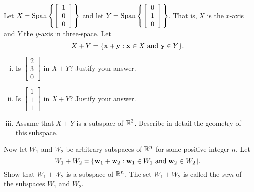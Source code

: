 \begin{example} ~

\ba
\item Let $X = \text{Span}\left\{ \left[ \begin{array}{c} 1\\0\\0 \end{array} \right] \right\}$ and let $Y = \text{Span}\left\{ \left[ \begin{array}{c} 0\\1\\0 \end{array} \right] \right\}$. That is, $X$ is the $x$-axis and $Y$ the $y$-axis in three-space. Let
\[X+Y = \{\mathbf{x}+\mathbf{y} : \mathbf{x} \in X \text{ and } \mathbf{y} \in Y\}.\]
	\begin{enumerate}[i.]
	\item Is $\left[ \begin{array}{c} 2\\3\\0 \end{array} \right]$ in $X+Y$? Justify your answer. 
	
	\item Is $\left[ \begin{array}{c} 1\\1\\1 \end{array} \right]$ in $X+Y$? Justify your  answer. 
	
	\item Assume that $X+Y$ is a subspace of $\mathbb{R}^3$. Describe in detail the geometry of this subspace.  
	
	\end{enumerate}

\item Now let $W_1$ and $W_2$ be arbitrary subspaces of $\mathbb{R}^n$ for some positive integer $n$. Let
\[W_1+W_2 = \{\mathbf{w}_1+\mathbf{w}_2 : \mathbf{w}_1 \in W_1 \text{ and } \mathbf{w}_2 \in W_2\}.\]
Show that $W_1+W_2$ is a subspace of $\mathbb{R}^n$.  The set $W_1+W_2$ is called the \emph{sum} of the subspaces $W_1$ and $W_2$.

\ea



\end{example}
